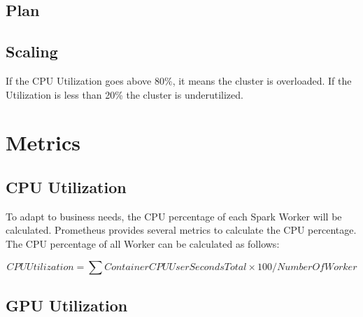 \subsection{Plan}

\subsection{Scaling}

If the CPU Utilization goes above 80\%, it means the cluster is overloaded. If the Utilization is less than 20\% the cluster is underutilized.


\section{Metrics}

\subsection{CPU Utilization}

To adapt to business needs, the CPU percentage of each Spark Worker will be calculated. Prometheus provides several metrics to calculate the CPU percentage. The CPU percentage of all Worker can be calculated as follows:

\begin{equation}
CPUUtilization = \sum ContainerCPUUserSecondsTotal \times 100 / NumberOfWorker
\label{eq:formel}
\end{equation}


\subsection{GPU Utilization}


